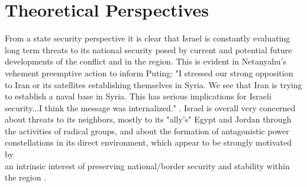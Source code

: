 \documentclass[a4paper]{article}\twocolumn
\begin{document}
\section{Theoretical Perspectives}
From a state security perspective it is clear that Israel is constantly evaluating long term threats to its national security posed by current and potential future developments of the conflict and in the region. This is evident in Netanyahu's vehement preemptive action to inform Puting: "I stressed our strong opposition to Iran or its satellites establishing themselves in Syria. We see that Iran is trying to establish a naval base in Syria. This has serious implications for Israeli security...I think the message was internalized." \cite{ravid_2017}. Israel is overall very concerned about threats to its neighbors, mostly to its "ally's" Egypt and Jordan through the activities of radical groups, and about the formation of antagonistic power constellations in its direct environment, which appear to be strongly motivated by \newline \vspace{3mm}\\ an intrinsic interest of preserving national/border security and stability within the region \cite{friedman_2016}. 
\end{document}
